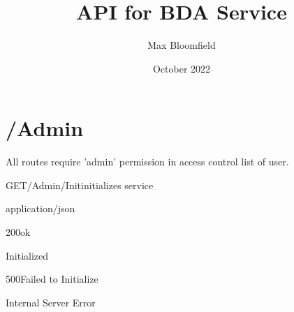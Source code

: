 \documentclass[12pt, etter]{article}
\title{API for BDA Service}
\author{Max Bloomfield}
\date{October 2022}
\begin{document}
\maketitle

\section{/Admin}
All routes require 'admin' permission in access control list of user.

\begin{apiRoute}{GET}{/Admin/Init}{initializes service}
    \begin{routeParameter}
    \end{routeParameter}
    \begin{routeResponse}{application/json}
        \begin{routeResponseItem}{200}{ok}
            \begin{routeResponseItemBody}
                Initialized
            \end{routeResponseItemBody}
        \end{routeResponseItem}
        \begin{routeResponseItem}{500}{Failed to Initialize}
            \begin{routeResponseItemBody}
                Internal Server Error
            \end{routeResponseItemBody}
        \end{routeResponseItem}
    \end{routeResponse}
\end{apiRoute}
\end{document}
